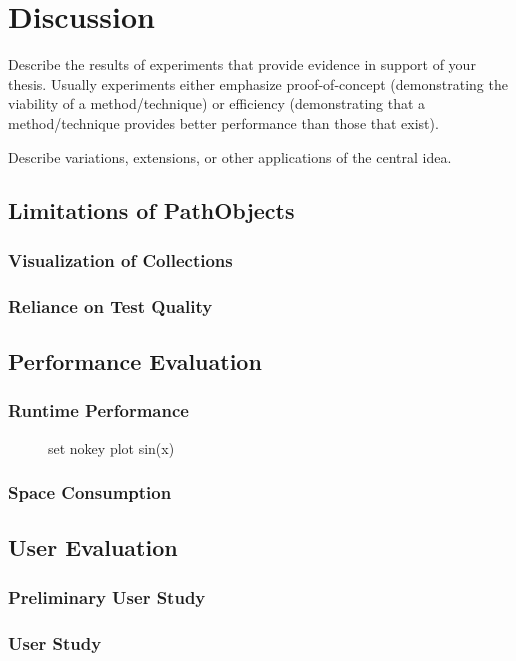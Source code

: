 \chapter{Discussion}
\label{c:discussion}

Describe the results of experiments that provide evidence in support of your thesis. Usually experiments either emphasize proof-of-concept (demonstrating the viability of a method/technique) or efficiency (demonstrating that a method/technique provides better performance than those that exist).

Describe variations, extensions, or other applications of the central idea.

\section{Limitations of PathObjects}
\subsection{Visualization of Collections}
\subsection{Reliance on Test Quality}

\section{Performance Evaluation}

\subsection{Runtime Performance}
\begin{figure}
	\begin{gnuplot}[terminal=pdf]
		set nokey
		plot sin(x)
	\end{gnuplot}
\end{figure}

\subsection{Space Consumption}

\section{User Evaluation}
\subsection{Preliminary User Study}
\subsection{User Study}